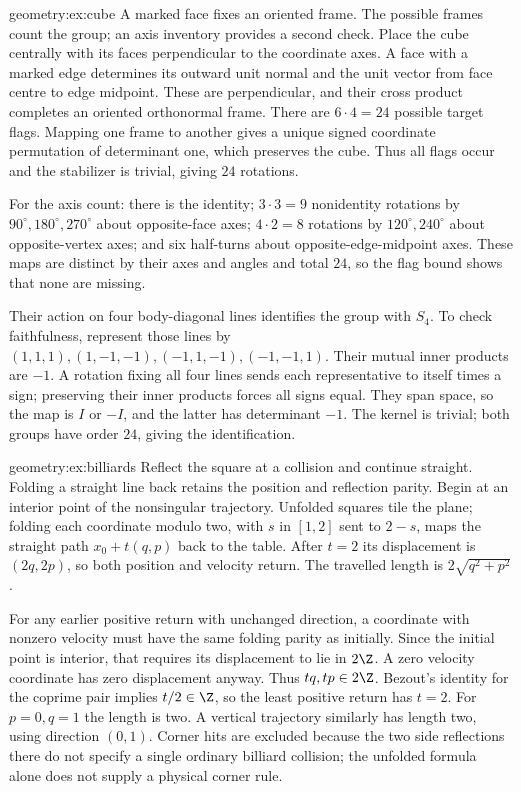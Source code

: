 \begin{solution}{geometry:ex:cube}
\idea A marked face fixes an oriented frame. The possible frames count the group; an axis inventory provides a second check.
\writeup Place the cube centrally with its faces perpendicular to the coordinate axes. A face with a marked edge determines its outward unit normal and the unit vector from face centre to edge midpoint. These are perpendicular, and their cross product completes an oriented orthonormal frame. There are $6\cdot4=24$ possible target flags. Mapping one frame to another gives a unique signed coordinate permutation of determinant one, which preserves the cube. Thus all flags occur and the stabilizer is trivial, giving $24$ rotations.

For the axis count: there is the identity; $3\cdot3=9$ nonidentity rotations by $90^\circ,180^\circ,270^\circ$ about opposite-face axes; $4\cdot2=8$ rotations by $120^\circ,240^\circ$ about opposite-vertex axes; and six half-turns about opposite-edge-midpoint axes. These maps are distinct by their axes and angles and total $24$, so the flag bound shows that none are missing.

Their action on four body-diagonal lines identifies the group with $S_4$. To check faithfulness, represent those lines by $(1,1,1),(1,-1,-1),(-1,1,-1),(-1,-1,1)$. Their mutual inner products are $-1$. A rotation fixing all four lines sends each representative to itself times a sign; preserving their inner products forces all signs equal. They span space, so the map is $I$ or $-I$, and the latter has determinant $-1$. The kernel is trivial; both groups have order $24$, giving the identification.
\end{solution}

\begin{solution}{geometry:ex:billiards}
\idea Reflect the square at a collision and continue straight. Folding a straight line back retains the position and reflection parity.
\writeup Begin at an interior point of the nonsingular trajectory. Unfolded squares tile the plane; folding each coordinate modulo two, with $s$ in $[1,2]$ sent to $2-s$, maps the straight path $x_0+t(q,p)$ back to the table. After $t=2$ its displacement is $(2q,2p)$, so both position and velocity return. The travelled length is $2\sqrt{q^2+p^2}$.

For any earlier positive return with unchanged direction, a coordinate with nonzero velocity must have the same folding parity as initially. Since the initial point is interior, that requires its displacement to lie in $2\Z$. A zero velocity coordinate has zero displacement anyway. Thus $tq,tp\in2\Z$. Bezout's identity for the coprime pair implies $t/2\in\Z$, so the least positive return has $t=2$. For $p=0,q=1$ the length is two. A vertical trajectory similarly has length two, using direction $(0,1)$. Corner hits are excluded because the two side reflections there do not specify a single ordinary billiard collision; the unfolded formula alone does not supply a physical corner rule.
\end{solution}

